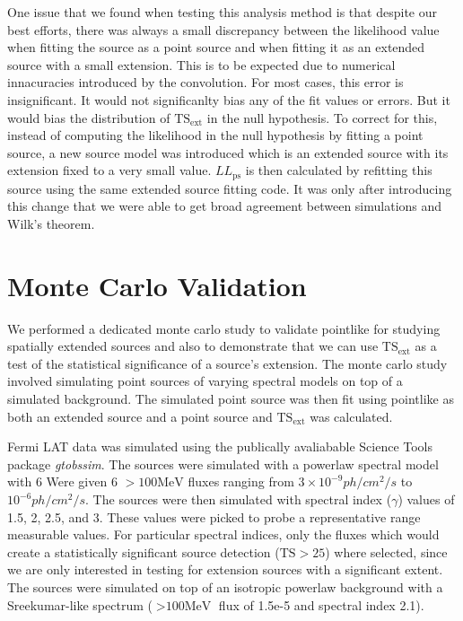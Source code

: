 \documentclass{emulateapj}
\begin{document}
One issue that we found when testing this analysis method is that
despite our best efforts, there was always a small discrepancy between
the likelihood value when fitting the source as a point source and when
fitting it as an extended source with a small extension.  This is to be
expected due to numerical innacuracies introduced by the convolution.
For most cases, this error is insignificant. It would not significanlty
bias any of the fit values or errors. But it would bias the distribution
of $\text{TS}_\text{ext}$ in the null hypothesis. To correct for this,
instead of computing the likelihood in the null hypothesis by fitting
a point source, a new source model was introduced which is an extended
source with its extension fixed to a very small value. $LL_\text{ps}$
is then calculated by refitting this source using the same extended
source fitting code. It was only after introducing this change that we
were able to get broad agreement between simulations and Wilk's theorem.

\section{Monte Carlo Validation}

We performed a dedicated monte carlo study to validate pointlike for
studying spatially extended sources and also to demonstrate that we can
use $\text{TS}_\text{ext}$ as a test of the statistical significance
of a source's extension.  The monte carlo study involved simulating point
sources of varying spectral models on top of a simulated background. The
simulated point source was then fit using pointlike as both an extended
source and a point source and $\text{TS}_\text{ext}$ was calculated.

Fermi LAT data was simulated using the publically avaliabable Science
Tools package {\em gtobssim}\cite{GTOBSSIM_CITATION}. The sources were
simulated with a powerlaw spectral model with 6 Were given 6 $>100\text{MeV}$
fluxes ranging from $3\times 10^{-9} ph/cm^2/s$ to $10^{-6} ph/cm^2/s$.
The sources were then simulated with spectral index ($\gamma$) values of
1.5, 2, 2.5, and 3.  These values were picked to probe a representative
range measurable values.  For particular spectral indices, only the
fluxes which would create a statistically significant source detection
($\text{TS}>25$) where selected, since we are only interested in
testing for extension sources with a significant extent. The sources were
simulated on top of an isotropic powerlaw background with a Sreekumar-like
spectrum ($>\text{100MeV}$ flux of 1.5e-5 and spectral index 2.1).\cite{Sreekumar
et al. ApJ 494 pag 523 1998}
\end{document}
